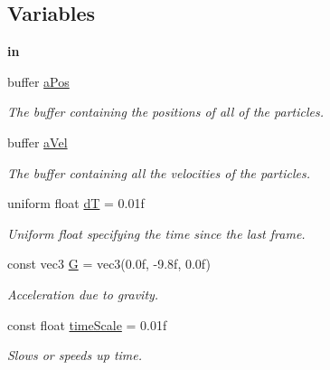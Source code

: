 \subsection*{Variables}
\begin{DoxyCompactItemize}
\item 
\mbox{\label{particle_8comp_a64b0840001d30ff8cd416759a03542ce}} 
{\bfseries in}
\item 
buffer \hyperlink{particle_8comp_a9f39e8aaa860ed0953f27908a3b221d0}{a\+Pos}
\begin{DoxyCompactList}\small\item\em The buffer containing the positions of all of the particles. \end{DoxyCompactList}\item 
buffer \hyperlink{particle_8comp_a8873b6c4414371b20f8c9adb4fbb0b0e}{a\+Vel}
\begin{DoxyCompactList}\small\item\em The buffer containing all the velocities of the particles. \end{DoxyCompactList}\item 
\mbox{\label{particle_8comp_afa6fb72b63888e1e0999df05216df22c}} 
uniform float \hyperlink{particle_8comp_afa6fb72b63888e1e0999df05216df22c}{dT} = 0.\+01f
\begin{DoxyCompactList}\small\item\em Uniform float specifying the time since the last frame. \end{DoxyCompactList}\item 
\mbox{\label{particle_8comp_a28376120f625e213331c1deb2e34108e}} 
const vec3 \hyperlink{particle_8comp_a28376120f625e213331c1deb2e34108e}{G} = vec3(0.\+0f, -\/9.\+8f, 0.\+0f)
\begin{DoxyCompactList}\small\item\em Acceleration due to gravity. \end{DoxyCompactList}\item 
\mbox{\label{particle_8comp_a5ebc1bad69dea0ec25d6a686b785183e}} 
const float \hyperlink{particle_8comp_a5ebc1bad69dea0ec25d6a686b785183e}{time\+Scale} = 0.\+01f
\begin{DoxyCompactList}\small\item\em Slows or speeds up time. \end{DoxyCompactList}\end{DoxyCompactItemize}


